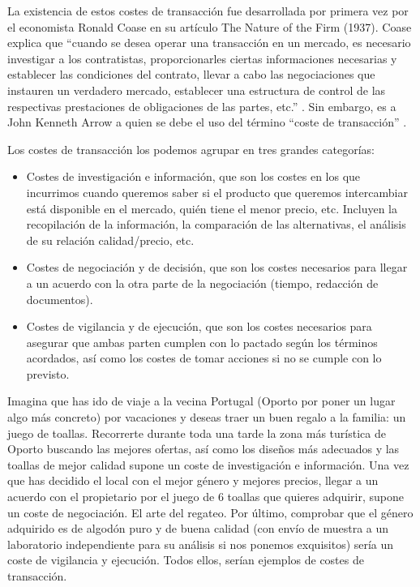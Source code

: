 \documentclass[
]{book}
\providecommand{\tightlist}{%
  \setlength{\itemsep}{0pt}\setlength{\parskip}{0pt}}
\begin{document}
La existencia de estos costes de transacción fue desarrollada por primera vez por el economista Ronald Coase en su artículo The Nature of the Firm (1937). Coase explica que ``cuando se desea operar una transacción en un mercado, es necesario investigar a los contratistas, proporcionarles ciertas informaciones necesarias y establecer las condiciones del contrato, llevar a cabo las negociaciones que instauren un verdadero mercado, establecer una estructura de control de las respectivas prestaciones de obligaciones de las partes, etc.'' \citep{coase1937}. Sin embargo, es a John Kenneth Arrow a quien se debe el uso del término ``coste de transacción'' \citep{arrow1969}.

Los costes de transacción los podemos agrupar en tres grandes categorías:

\begin{itemize}
\tightlist
\item
  Costes de investigación e información, que son los costes en los que incurrimos cuando queremos saber si el producto que queremos intercambiar está disponible en el mercado, quién tiene el menor precio, etc. Incluyen la recopilación de la información, la comparación de las alternativas, el análisis de su relación calidad/precio, etc.
\item
  Costes de negociación y de decisión, que son los costes necesarios para llegar a un acuerdo con la otra parte de la negociación (tiempo, redacción de documentos).
\item
  Costes de vigilancia y de ejecución, que son los costes necesarios para asegurar que ambas parten cumplen con lo pactado según los términos acordados, así como los costes de tomar acciones si no se cumple con lo previsto.
\end{itemize}

Imagina que has ido de viaje a la vecina Portugal (Oporto por poner un lugar algo más concreto) por vacaciones y deseas traer un buen regalo a la familia: un juego de toallas. Recorrerte durante toda una tarde la zona más turística de Oporto buscando las mejores ofertas, así como los diseños más adecuados y las toallas de mejor calidad supone un coste de investigación e información. Una vez que has decidido el local con el mejor género y mejores precios, llegar a un acuerdo con el propietario por el juego de 6 toallas que quieres adquirir, supone un coste de negociación. El arte del regateo. Por último, comprobar que el género adquirido es de algodón puro y de buena calidad (con envío de muestra a un laboratorio independiente para su análisis si nos ponemos exquisitos) sería un coste de vigilancia y ejecución. Todos ellos, serían ejemplos de costes de transacción.
\end{document}
